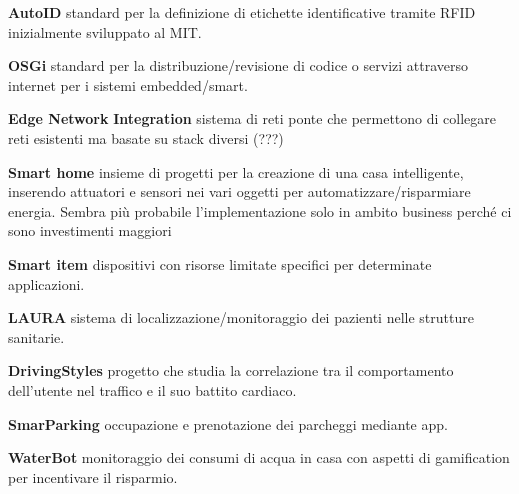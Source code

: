 \textbf{AutoID} standard per la definizione di etichette identificative
tramite RFID inizialmente sviluppato al MIT.

\textbf{OSGi} standard per la distribuzione/revisione di codice o
servizi attraverso internet per i sistemi embedded/smart.

\textbf{Edge Network} \textbf{Integration} sistema di reti ponte che
permettono di collegare reti esistenti ma basate su stack diversi (???)

\textbf{Smart home} insieme di progetti per la creazione di una casa
intelligente, inserendo attuatori e sensori nei vari oggetti per
automatizzare/risparmiare energia. Sembra più probabile
l'implementazione solo in ambito business perché ci sono investimenti
maggiori

\textbf{Smart item} dispositivi con risorse limitate specifici per
determinate applicazioni.

\textbf{LAURA} sistema di localizzazione/monitoraggio dei pazienti nelle
strutture sanitarie.

\textbf{DrivingStyles} progetto che studia la correlazione tra il
comportamento dell'utente nel traffico e il suo battito cardiaco.

\textbf{SmarParking} occupazione e prenotazione dei parcheggi mediante
app.

\textbf{WaterBot} monitoraggio dei consumi di acqua in casa con aspetti
di gamification per incentivare il risparmio.
